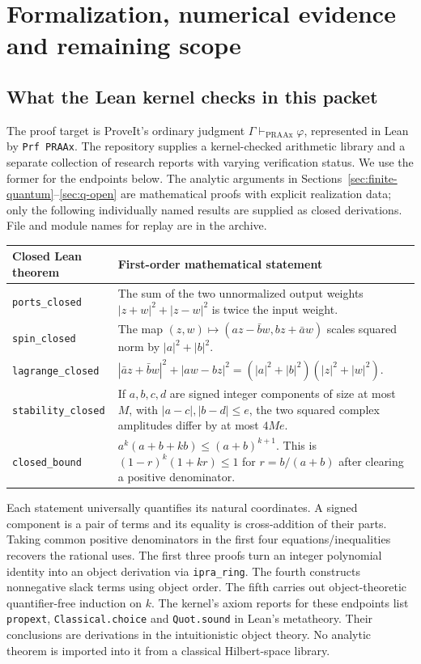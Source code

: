 \section{Formalization, numerical evidence and remaining scope}\label{sec:lean}
\subsection{What the Lean kernel checks in this packet}
The proof target is ProveIt's ordinary judgment $\Gamma\vdash_{\mathrm{PRAAx}}\varphi$, represented in Lean by \texttt{Prf PRAAx}. The repository supplies a kernel-checked arithmetic library and a separate collection of research reports with varying verification status. We use the former for the endpoints below. The analytic arguments in Sections~\ref{sec:finite-quantum}--\ref{sec:q-open} are mathematical proofs with explicit realization data; only the following individually named results are supplied as closed derivations. File and module names for replay are in the archive.

\begin{center}\small\renewcommand{\arraystretch}{1.22}
\begin{tabularx}{\linewidth}{@{}p{.29\linewidth}X@{}}\toprule
Closed Lean theorem & First-order mathematical statement \\ \midrule
\texttt{ports\_closed} & The sum of the two unnormalized output weights $|z+w|^2+|z-w|^2$ is twice the input weight.\\
\texttt{spin\_closed} & The map $(z,w)\mapsto(az-\bar b w,bz+\bar a w)$ scales squared norm by $|a|^2+|b|^2$.\\
\texttt{lagrange\_closed} & $|\bar a z+\bar b w|^2+|aw-bz|^2=(|a|^2+|b|^2)(|z|^2+|w|^2)$.\\
\texttt{stability\_closed} & If $a,b,c,d$ are signed integer components of size at most $M$, with $|a-c|,|b-d|\le e$, the two squared complex amplitudes differ by at most $4Me$.\\
\texttt{closed\_bound} & $a^k(a+b+kb)\le(a+b)^{k+1}$. This is $(1-r)^k(1+kr)\le1$ for $r=b/(a+b)$ after clearing a positive denominator.\\ \bottomrule
\end{tabularx}\end{center}
Each statement universally quantifies its natural coordinates. A signed component is a pair of terms and its equality is cross-addition of their parts. Taking common positive denominators in the first four equations/inequalities recovers the rational uses. The first three proofs turn an integer polynomial identity into an object derivation via \texttt{ipra\_ring}. The fourth constructs nonnegative slack terms using object order. The fifth carries out object-theoretic quantifier-free induction on $k$. The kernel's axiom reports for these endpoints list \texttt{propext}, \texttt{Classical.choice} and \texttt{Quot.sound} in Lean's metatheory. Their conclusions are derivations in the intuitionistic object theory. No analytic theorem is imported into it from a classical Hilbert-space library.

